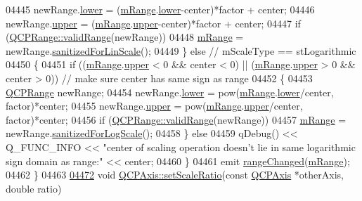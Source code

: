 \begin{DoxyCode}
04445     newRange.\hyperlink{a00049_aa3aca3edb14f7ca0c85d912647b91745}{lower} = (\hyperlink{a00025_a1ee36773c49062d751560e11f90845f7}{mRange}.\hyperlink{a00049_aa3aca3edb14f7ca0c85d912647b91745}{lower}-center)*factor + center;
04446     newRange.\hyperlink{a00049_ae44eb3aafe1d0e2ed34b499b6d2e074f}{upper} = (\hyperlink{a00025_a1ee36773c49062d751560e11f90845f7}{mRange}.\hyperlink{a00049_ae44eb3aafe1d0e2ed34b499b6d2e074f}{upper}-center)*factor + center;
04447     \textcolor{keywordflow}{if} (\hyperlink{a00049_ab38bd4841c77c7bb86c9eea0f142dcc0}{QCPRange::validRange}(newRange))
04448       \hyperlink{a00025_a1ee36773c49062d751560e11f90845f7}{mRange} = newRange.\hyperlink{a00049_a1ff029704c29a75adbc1dc36cecaf44c}{sanitizedForLinScale}();
04449   \} \textcolor{keywordflow}{else} \textcolor{comment}{// mScaleType == stLogarithmic}
04450   \{
04451     \textcolor{keywordflow}{if} ((\hyperlink{a00025_a1ee36773c49062d751560e11f90845f7}{mRange}.\hyperlink{a00049_ae44eb3aafe1d0e2ed34b499b6d2e074f}{upper} < 0 && center < 0) || (\hyperlink{a00025_a1ee36773c49062d751560e11f90845f7}{mRange}.\hyperlink{a00049_ae44eb3aafe1d0e2ed34b499b6d2e074f}{upper} > 0 && center > 0)) \textcolor{comment}{// make
       sure center has same sign as range}
04452     \{
04453       \hyperlink{a00049}{QCPRange} newRange;
04454       newRange.\hyperlink{a00049_aa3aca3edb14f7ca0c85d912647b91745}{lower} = pow(\hyperlink{a00025_a1ee36773c49062d751560e11f90845f7}{mRange}.\hyperlink{a00049_aa3aca3edb14f7ca0c85d912647b91745}{lower}/center, factor)*center;
04455       newRange.\hyperlink{a00049_ae44eb3aafe1d0e2ed34b499b6d2e074f}{upper} = pow(\hyperlink{a00025_a1ee36773c49062d751560e11f90845f7}{mRange}.\hyperlink{a00049_ae44eb3aafe1d0e2ed34b499b6d2e074f}{upper}/center, factor)*center;
04456       \textcolor{keywordflow}{if} (\hyperlink{a00049_ab38bd4841c77c7bb86c9eea0f142dcc0}{QCPRange::validRange}(newRange))
04457         \hyperlink{a00025_a1ee36773c49062d751560e11f90845f7}{mRange} = newRange.\hyperlink{a00049_aaf6a9046e78d91eeb8e89584fe46b034}{sanitizedForLogScale}();
04458     \} \textcolor{keywordflow}{else}
04459       qDebug() << Q\_FUNC\_INFO << \textcolor{stringliteral}{"center of scaling operation doesn't lie in same logarithmic sign domain
       as range:"} << center;
04460   \}
04461   emit \hyperlink{a00025_a0894084e4c16a1736534c4095746f910}{rangeChanged}(\hyperlink{a00025_a1ee36773c49062d751560e11f90845f7}{mRange});
04462 \}
04463 
\hypertarget{a00115_source_l04472}{}\hyperlink{a00025_af4bbd446dcaee5a83ac30ce9bcd6e125}{04472} \textcolor{keywordtype}{void} \hyperlink{a00025_af4bbd446dcaee5a83ac30ce9bcd6e125}{QCPAxis::setScaleRatio}(\textcolor{keyword}{const} \hyperlink{a00025}{QCPAxis} *otherAxis, \textcolor{keywordtype}{double} ratio)

\end{DoxyCode}
